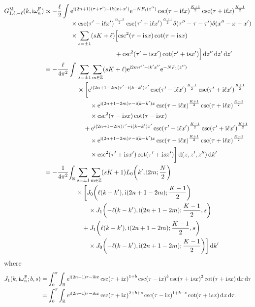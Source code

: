 \documentclass[english, parskip=full]{scrartcl}
\begin{document}
\begin{align}
G_{1,\ell,-\ell}^\M(k,\i\omega_n^\F) &\propto -\frac{\ell}{2} \int \bsplit{& \powe{\i (2n+1)(\tau+\tau') - \i k(x+x')} \powe{-NF_1(z'')} \csc\kla*{\tau - \i \ell x}^{\frac{K+1}{2}} \csc\kla*{\tau + \i \ell x}^{\frac{K-1}{2}} \\
&\times \csc\kla*{\tau' - \i \ell x'}^{\frac{K-1}{2}} \csc\kla*{\tau' + \i \ell x'}^{\frac{K+1}{2}} \delta(\tau''-\tau-\tau') \delta(x''-x-x')\\
&\times \sum_{s=\pm 1} \kla*{sK+\ell} \klb[\Big]{ \csc^2(\tau - \i sx) \cot\kla*{\tau - \i sx} \\
&\qquad\qquad\qquad\quad + \csc^2(\tau' + \i sx') \cot\kla*{\tau' + \i sx'}}\,\d z'' \,\d z'\,\d z'}\\
&= -\frac{\ell}{4\pi^2} \int \bsplit{& \sum_{s=\pm 1} \sum_{m\in\mathbb{Z}} \kla*{sK+\ell} \powe{\i 2m \tau'' -\i k'x''} \powe{-NF_1(z'')}\\
&\times \klb[\bigg]{\powe{\i (2n+1-2m) \tau' -\i (k-k') x'}  \csc\kla*{\tau' - \i \ell x'}^{\frac{K-1}{2}} \csc\kla*{\tau' + \i \ell x'}^{\frac{K+1}{2}}\\
&\qquad\times \powe{\i (2n+1-2m) \tau -\i (k-k') x} \csc\kla*{\tau - \i \ell x}^{\frac{K+1}{2}} \csc\kla*{\tau + \i \ell x}^{\frac{K-1}{2}}\\
&\qquad\times \csc^2(\tau - \i sx) \cot\kla*{\tau - \i sx}\\
&\quad + \powe{\i (2n+1-2m) \tau' -\i (k-k') x'}  \csc\kla*{\tau' - \i \ell x'}^{\frac{K-1}{2}} \csc\kla*{\tau' + \i \ell x'}^{\frac{K+1}{2}}\\
&\quad\quad\times \powe{\i (2n+1-2m) \tau -\i (k-k') x} \csc\kla*{\tau - \i \ell x}^{\frac{K+1}{2}} \csc\kla*{\tau + \i \ell x}^{\frac{K-1}{2}}\\
&\quad\quad\times \csc^2(\tau' + \i sx') \cot\kla*{\tau' + \i sx'}}\,\d (z,z',z'')\,\d k' }\\
&= -\frac{1}{4\pi^2} \bsplit{\intr{& \sum_{s=\pm 1} \sum_{m\in\mathbb{Z}} (sK+1) L_0\kla*{k',\i 2m; \frac{N}{2}} \\
&\times \klb[\bigg]{ J_0\kla*{\ell(k-k'), \i (2n+1-2m); \frac{K-1}{2}}\\
&\qquad\times J_1\kla*{-\ell(k-k'), \i (2n+1-2m); \frac{K-1}{2}, s}\\
&\quad + J_1\kla*{\ell(k-k'), \i (2n+1-2m); \frac{K-1}{2}, s}\\
&\quad\quad\times J_0\kla*{-\ell(k-k'), \i (2n+1-2m); \frac{K-1}{2}}} }{k'}}
\end{align}
where
\begin{align}
J_1(k,\i\omega_n^\F;b,s) &= \intx{0}{\pi}{\intr{\powe{\i (2n+1)\tau - \i kx} \csc\kla*{\tau + \i x}^{1+b} \csc\kla*{\tau - \i x}^b \csc\kla*{\tau + \i sx}^2 \cot\kla*{\tau + \i sx} }{x} }{\tau}\\
&= \intx{0}{\pi}{\intr{\powe{\i (2n+1)\tau - \i kx} \csc\kla*{\tau + \i x}^{2+b+s} \csc\kla*{\tau - \i x}^{1+b-s} \cot\kla*{\tau + \i sx} }{x} }{\tau}.
\end{align}
\end{document}
